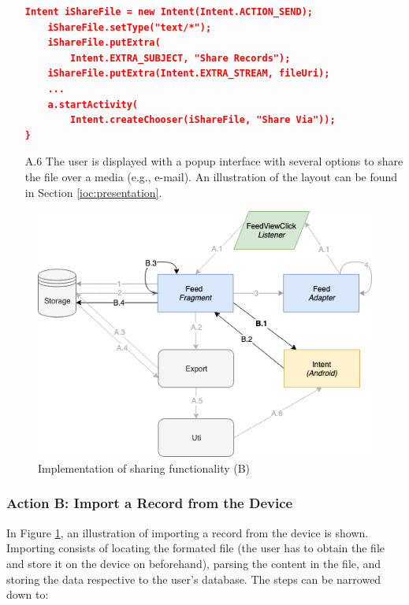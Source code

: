 \begin{itemize}
\begin{lstlisting}[language=json, caption={}, captionpos=b]
    Intent iShareFile = new Intent(Intent.ACTION_SEND);
    iShareFile.setType("text/*");
    iShareFile.putExtra(
        Intent.EXTRA_SUBJECT, "Share Records");
    iShareFile.putExtra(Intent.EXTRA_STREAM, fileUri);
    ...
    a.startActivity(
        Intent.createChooser(iShareFile, "Share Via"));
}

\end{lstlisting}

    \item[A.6] The user is displayed with a popup interface with several options to share the file over a media (e.g., e-mail). An illustration of the layout can be found in Section \ref{ioc:presentation}. 


\end{itemize}


\begin{figure}
    \centering
    \includegraphics[scale=0.5]{images/Sharing_ImpB.png}
    \caption{Implementation of sharing functionality (B)}
    \label{fig:impl_sharingB}
\end{figure}

\subsubsection{Action B: Import a Record from the Device}
In Figure \ref{fig:impl_sharingB}, an illustration of importing a record from the device is shown. Importing consists of locating the formated file (the user has to obtain the file and store it on the device on beforehand), parsing the content in the file, and storing the data respective to the user's database. The steps can be narrowed down to:

